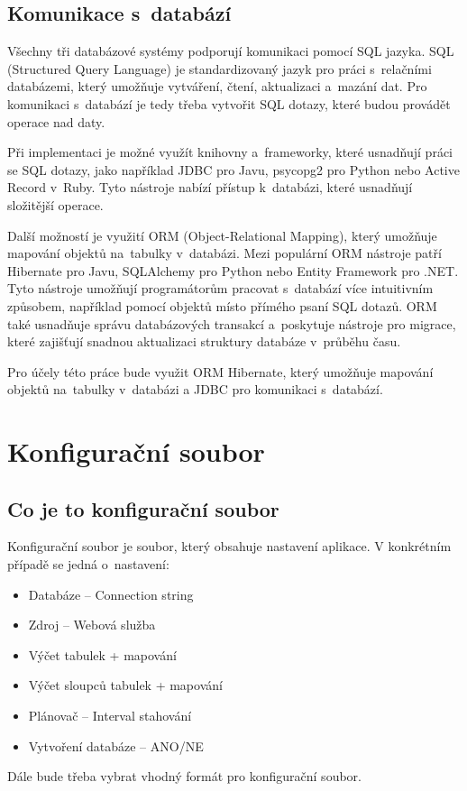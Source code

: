 \documentclass[czech, kiv, ba, he, iso690numb, pdf]{fasthesis}
\begin{document}
\section{Komunikace s~databází}
Všechny tři databázové systémy podporují komunikaci pomocí SQL jazyka.
SQL (Structured Query Language) je standardizovaný jazyk pro práci s~relačními databázemi,
který umožňuje vytváření, čtení, aktualizaci a~mazání dat.
Pro komunikaci s~databází je tedy třeba vytvořit SQL dotazy, které budou provádět operace nad daty.

Při implementaci je možné využít knihovny a~frameworky, které usnadňují práci se SQL dotazy, 
jako například JDBC pro Javu, psycopg2 pro Python nebo Active Record v~Ruby. 
Tyto nástroje nabízí přístup k~databázi, které usnadňují složitější operace.

Další možností je využití ORM (Object-Relational Mapping), který umožňuje mapování objektů na~tabulky v~databázi.
Mezi populární ORM nástroje patří Hibernate pro Javu, SQLAlchemy pro Python nebo Entity Framework pro .NET. 
Tyto nástroje umožňují programátorům pracovat s~databází více intuitivním způsobem, například pomocí objektů 
místo přímého psaní SQL dotazů. ORM také usnadňuje správu databázových transakcí a~poskytuje nástroje pro migrace, 
které zajišťují snadnou aktualizaci struktury databáze v~průběhu času.

Pro účely této práce bude využit ORM Hibernate, který umožňuje mapování objektů na~tabulky v~databázi a JDBC pro komunikaci s~databází.

\chapter{Konfigurační soubor}
\section{Co je to konfigurační soubor}
Konfigurační soubor je soubor, který obsahuje nastavení aplikace.
V konkrétním případě se jedná o~nastavení:
\begin{itemize}
    \item Databáze -- Connection string
    \item Zdroj -- Webová služba
    \item Výčet tabulek + mapování
    \item Výčet sloupců tabulek + mapování
    \item Plánovač -- Interval stahování
    \item Vytvoření databáze -- ANO/NE
\end{itemize}
Dále bude třeba vybrat vhodný formát pro konfigurační soubor.
\end{document}
